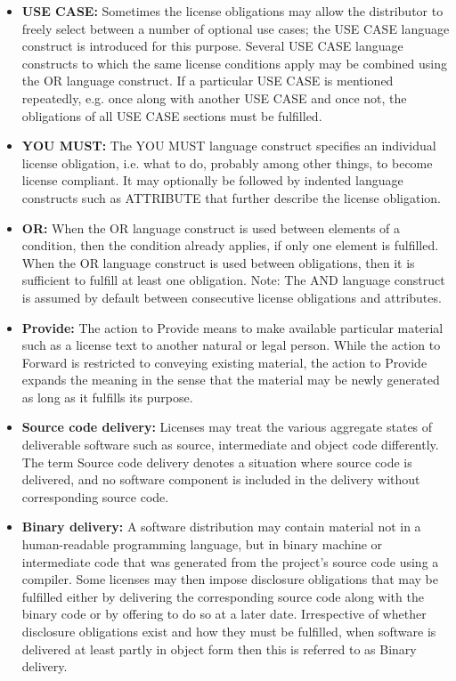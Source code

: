 \begin{itemize}
	\item \textbf{USE CASE:} Sometimes the license obligations may allow the distributor to freely select between a number of optional use cases; the USE CASE language construct is introduced for this purpose. Several USE CASE language constructs to which the same license conditions apply may be combined using the OR language construct. If a particular USE CASE is mentioned repeatedly, e.g. once along with another USE CASE and once not, the obligations of all USE CASE sections must be fulfilled.
	\item \textbf{YOU MUST:} The YOU MUST language construct specifies an individual license obligation, i.e. what to do, probably among other things, to become license compliant. It may optionally be followed by indented language constructs such as ATTRIBUTE that further describe the license obligation.
	\item \textbf{OR:} When the OR language construct is used between elements of a condition, then the condition already applies, if only one element is fulfilled. When the OR language construct is used between obligations, then it is sufficient to fulfill at least one obligation. Note: The AND language construct is assumed by default between consecutive license obligations and attributes.
	\item \textbf{Provide:} The action to Provide means to make available particular material such as a license text to another natural or legal person. While the action to Forward is restricted to conveying existing material, the action to Provide expands the meaning in the sense that the material may be newly generated as long as it fulfills its purpose.
	\item \textbf{Source code delivery:} Licenses may treat the various aggregate states of deliverable software such as source, intermediate and object code differently. The term Source code delivery denotes a situation where source code is delivered, and no software component is included in the delivery without corresponding source code.
	\item \textbf{Binary delivery:} A software distribution may contain material not in a human-readable programming language, but in binary machine or intermediate code that was generated from the project's source code using a compiler. Some licenses may then impose disclosure obligations that may be fulfilled either by delivering the corresponding source code along with the binary code or by offering to do so at a later date. Irrespective of whether disclosure obligations exist and how they must be fulfilled, when software is delivered at least partly in object form then this is referred to as Binary delivery.

\end{itemize}
